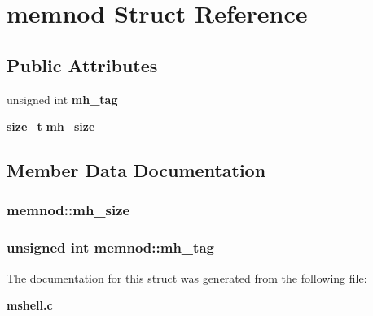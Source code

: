 \section{memnod  Struct Reference}
\label{structmemnod}
\subsection*{Public Attributes}
\begin{CompactItemize}
\item 
unsigned int {\bf mh\_\-tag}
\item 
{\bf size\_\-t} {\bf mh\_\-size}
\end{CompactItemize}


\subsection{Member Data Documentation}
\subsubsection{ memnod::mh\_\-size}\label{structmemnod_m1}


\subsubsection{\setlength{\rightskip}{0pt plus 5cm}unsigned int memnod::mh\_\-tag}\label{structmemnod_m0}




The documentation for this struct was generated from the following file:\begin{CompactItemize}
\item 
{\bf mshell.c}\end{CompactItemize}

